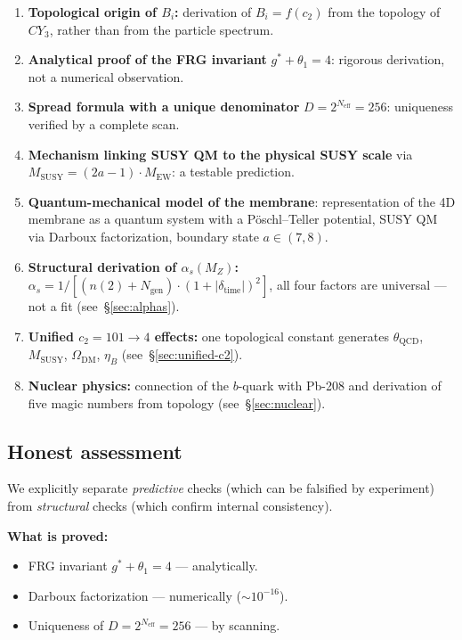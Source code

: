 \documentclass[11pt,a4paper]{article}
\newcommand{\CY}{\ensuremath{CY_3}}
\newcommand{\gstar}{\ensuremath{g^*}}
\newcommand{\Neff}{\ensuremath{N_{\text{eff}}}}
\newcommand{\MEW}{\ensuremath{M_{\text{EW}}}}
\newcommand{\MSUSY}{\ensuremath{M_{\text{SUSY}}}}
\newcommand{\cTwo}{\ensuremath{c_2}}
\theoremstyle{definition}
\begin{document}
\begin{enumerate}
    \item \textbf{Topological origin of $B_i$:}
          derivation of $B_i = f(\cTwo)$ from the topology of $\CY$,
          rather than from the particle spectrum.
    \item \textbf{Analytical proof of the FRG invariant}
          $\gstar + \theta_1 = 4$: rigorous derivation,
          not a numerical observation.
    \item \textbf{Spread formula with a unique denominator}
          $D = 2^{\Neff} = 256$: uniqueness verified by
          a complete scan.
    \item \textbf{Mechanism linking SUSY QM to the physical SUSY scale}
          via $\MSUSY = (2a-1) \cdot \MEW$: a testable prediction.
    \item \textbf{Quantum-mechanical model of the membrane}:
          representation of the 4D membrane as a quantum system
          with a P\"oschl--Teller potential, SUSY QM via
          Darboux factorization, boundary state
          $a \in (7, 8)$.
    \item \textbf{Structural derivation of $\alpha_s(M_Z)$:}
          $\alpha_s = 1/[(n(2)+N_{\text{gen}})
          \cdot (1+|\delta_{\text{time}}|)^2]$, all four
          factors are universal --- not a fit (see~\S\ref{sec:alphas}).
    \item \textbf{Unified $c_2 = 101 \to 4$ effects:}
          one topological constant generates $\theta_{\text{QCD}}$,
          $M_{\text{SUSY}}$, $\Omega_{\text{DM}}$, $\eta_B$
          (see~\S\ref{sec:unified-c2}).
    \item \textbf{Nuclear physics:} connection of the $b$-quark with Pb-208
          and derivation of five magic numbers from topology
          (see~\S\ref{sec:nuclear}).
\end{enumerate}

\subsection{Honest assessment}

We explicitly separate \emph{predictive} checks (which can be
falsified by experiment) from \emph{structural} checks
(which confirm internal consistency).

\medskip\noindent
\textbf{What is proved:}
\begin{itemize}
    \item FRG invariant $\gstar + \theta_1 = 4$ --- analytically.
    \item Darboux factorization --- numerically ($\sim 10^{-16}$).
    \item Uniqueness of $D = 2^{\Neff} = 256$ --- by scanning.
\end{itemize}
\end{document}
